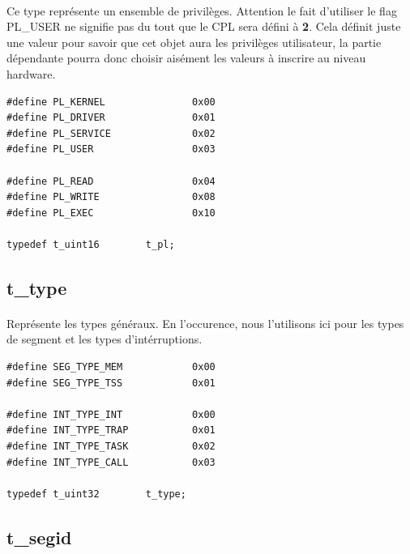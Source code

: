\documentclass[10pt,a4wide]{article}
\begin{document}
\paragraph{}

Ce type repr\'esente un ensemble de privil\`eges. Attention le fait
d'utiliser le flag PL\_USER ne signifie pas du tout que le CPL sera
d\'efini \`a \textbf{2}. Cela d\'efinit juste une valeur pour savoir
que cet objet aura les privil\`eges utilisateur, la partie d\'ependante
pourra donc choisir ais\'ement les valeurs \`a inscrire au niveau hardware.

\begin{verbatim}
#define PL_KERNEL               0x00
#define PL_DRIVER               0x01
#define PL_SERVICE              0x02
#define PL_USER                 0x03

#define PL_READ                 0x04
#define PL_WRITE                0x08
#define PL_EXEC                 0x10

typedef t_uint16        t_pl;
\end{verbatim}

\subsection{t\_type}

\paragraph{}

Repr\'esente les types g\'en\'eraux. En l'occurence, nous l'utilisons
ici pour les types de segment et les types d'int\'erruptions.

\begin{verbatim}
#define SEG_TYPE_MEM            0x00
#define SEG_TYPE_TSS            0x01

#define INT_TYPE_INT            0x00
#define INT_TYPE_TRAP           0x01
#define INT_TYPE_TASK           0x02
#define INT_TYPE_CALL           0x03

typedef t_uint32        t_type;
\end{verbatim}

\subsection{t\_segid}

\paragraph{}
\end{document}
